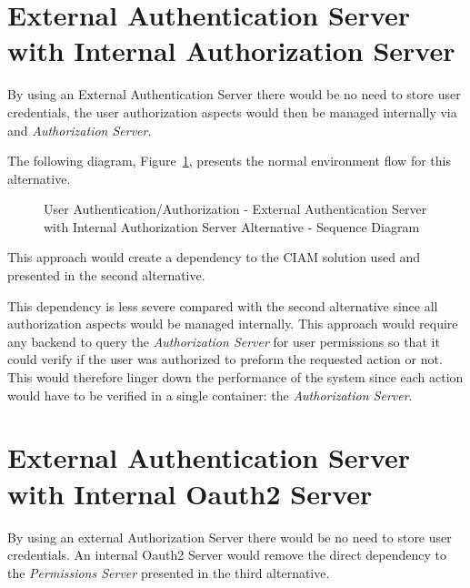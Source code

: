 \section{External Authentication Server with Internal Authorization Server}
\label{sec:design:alternatives:auth:externalauthinternalpermission}

By using an External Authentication Server there would be no need to store user credentials, the user authorization aspects would then be managed internally via and \textit{Authorization Server}.

The following diagram, Figure~\ref{fig:design:alternatives:auth:externalauthinternalpermission:diagram}, presents the normal environment flow for this alternative.

\begin{figure}[H]
   \centering
   \resizebox{\columnwidth}{!}
   {
      
   }
   \caption[User Authentication/Authorization - External Authentication Server with Internal Authorization Server Alternative - Sequence Diagram]{User Authentication/Authorization - External Authentication Server with Internal Authorization Server Alternative - Sequence Diagram}
   \label{fig:design:alternatives:auth:externalauthinternalpermission:diagram}
\end{figure}

This approach would create a dependency to the \gls{CIAM} solution used and presented in the second alternative.

This dependency is less severe compared with the second alternative since all authorization aspects would be managed internally.
This approach would require any backend to query the \textit{Authorization Server} for user permissions so that it could verify if the user was authorized to preform the requested action or not. This would therefore linger down the performance of the system since each action would have to be verified in a single container: the \textit{Authorization Server}.

\section{External Authentication Server with Internal Oauth2 Server}
\label{sec:design:alternatives:auth:externalauthinternaloauth}

By using an external Authorization Server there would be no need to store user credentials. An internal Oauth2 Server would remove the direct dependency to the \textit{Permissions Server} presented in the third alternative.

